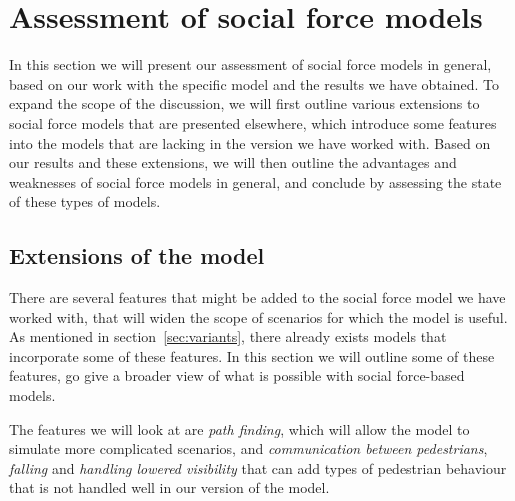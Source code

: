 \section{Assessment of social force models}
\label{sec:assessment}
In this section we will present our assessment of social force models in 
general, based on our work with the specific model and the results we have 
obtained. To expand the scope of the discussion, we will first outline various 
extensions to social force models that are presented elsewhere, which 
introduce some features into the models that are lacking in the version we 
have worked with. Based on our results and these extensions, we will then 
outline the advantages and weaknesses of social force models in general, and 
conclude by assessing the state of these types of models.

\subsection{Extensions of the model}
There are several features that might be added to the social force model we 
have worked with, that will widen the scope of scenarios for which the model 
is useful. As mentioned in section~\ref{sec:variants}, there already exists 
models that incorporate some of these features. In this section we will 
outline some of these features, go give a broader view of what is possible 
with social force-based models.

The features we will look at are \emph{path finding}, which will allow the 
model to simulate more complicated scenarios, and \emph{communication between 
pedestrians}, \emph{falling} and \emph{handling lowered visibility} that can 
add types of pedestrian behaviour that is not handled well in our version of 
the model.

